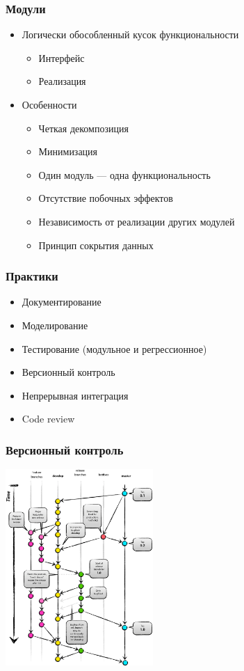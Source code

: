 \documentclass{../../slides-style}
\begin{document}
    \begin{frame}
        \frametitle{Модули}
        \begin{itemize}
            \item Логически обособленный кусок функциональности
            \begin{itemize}
                \item Интерфейс
                \item Реализация
            \end{itemize}
            \item Особенности
            \begin{itemize}
                \item Четкая декомпозиция
                \item Минимизация
                \item Один модуль --- одна функциональность
                \item Отсутствие побочных эффектов
                \item Независимость от реализации других модулей
                \item Принцип сокрытия данных
            \end{itemize}
        \end{itemize}
    \end{frame}

    \begin{frame}
        \frametitle{Практики}
        \begin{itemize}
            \item Документирование
            \item Моделирование
            \item Тестирование (модульное и регрессионное)
            \item Версионный контроль
            \item Непрерывная интеграция
            \item Code review
        \end{itemize}
    \end{frame}

    \begin{frame}
        \frametitle{Версионный контроль}
        \begin{center}
            \includegraphics[width=0.42\textwidth]{git-flow.png}
        \end{center}
    \end{frame}
\end{document}
